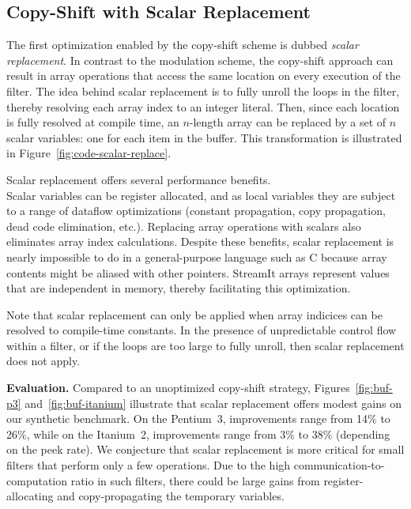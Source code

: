 \subsection{Copy-Shift with Scalar Replacement}
\label{sec:scalar-replacement}

The first optimization enabled by the copy-shift scheme is dubbed {\it
scalar replacement}.  In contrast to the modulation scheme, the
copy-shift approach can result in array operations that access the
same location on every execution of the filter.  The idea behind
scalar replacement is to fully unroll the loops in the filter, thereby
resolving each array index to an integer literal.  Then, since each
location is fully resolved at compile time, an $n$-length array can be
replaced by a set of $n$ scalar variables: one for each item in the
buffer.  This transformation is illustrated in
Figure~\ref{fig:code-scalar-replace}.

Scalar replacement offers several performance benefits.\\ Scalar
variables can be register allocated, and as local variables they are
subject to a range of dataflow optimizations (constant propagation,
copy propagation, dead code elimination, etc.).  Replacing array
operations with scalars also eliminates array index calculations.
Despite these benefits, scalar replacement is nearly impossible to do
in a general-purpose language such as C because array contents might
be aliased with other pointers.  StreamIt arrays represent values that
are independent in memory, thereby facilitating this optimization.

Note that scalar replacement can only be applied when array indicices
can be resolved to compile-time constants.  In the presence of unpredictable
control flow within a filter, or if the loops are too large to fully unroll,
then scalar replacement does not apply.

{\bf Evaluation.}  Compared to an unoptimized copy-shift strategy,
Figures~\ref{fig:buf-p3} and~\ref{fig:buf-itanium} illustrate that
scalar replacement offers modest gains on our synthetic benchmark.  On
the Pentium~3, improvements range from 14\% to 26\%, while on the
Itanium~2, improvements range from 3\% to 38\% (depending on the peek
rate).  We conjecture that scalar replacement is more critical for
small filters that perform only a few operations.  Due to the high
communication-to-computation ratio in such filters, there could be
large gains from register-allocating and copy-propagating the
temporary variables.


